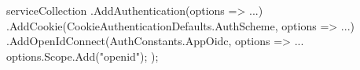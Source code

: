 \begin{spverbatim}
    serviceCollection
    .AddAuthentication(options => {...})
    .AddCookie(CookieAuthenticationDefaults.AuthScheme,
        options => {...})
    .AddOpenIdConnect(AuthConstants.AppOidc, options =>
    {
        ...
        options.Scope.Add("openid");
    });
\end{spverbatim}